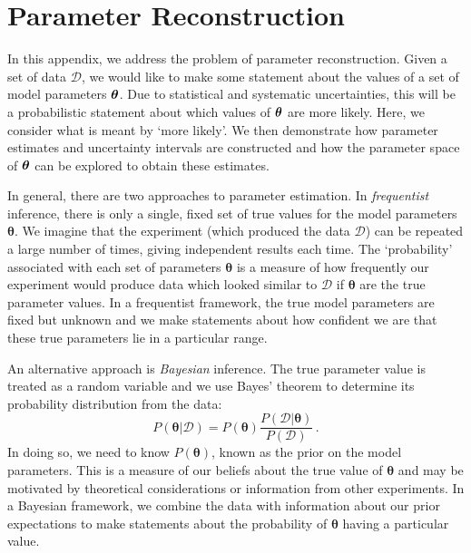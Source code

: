 \chapter{Parameter Reconstruction}
\label{ch:ParamRecon}



In this appendix, we address the problem of parameter reconstruction. Given a set of data $\mathcal{D}$, we would like to make some statement about the values of a set of model parameters $\boldsymbol\theta$. Due to statistical and systematic uncertainties, this will be a probabilistic statement about which values of $\boldsymbol\theta$ are more likely. Here, we consider what is meant by `more likely'. We then demonstrate how parameter estimates and uncertainty intervals are constructed and how the parameter space of $\boldsymbol\theta$ can be explored to obtain these estimates.

In general, there are two approaches to parameter estimation. In \textit{frequentist} inference, there is only a single, fixed set of true values for the model parameters $\boldsymbol\theta$. We imagine that the experiment (which produced the data $\mathcal{D}$) can be repeated a large number of times, giving independent results each time. The `probability' associated with each set of parameters $\boldsymbol\theta$ is a measure of how frequently our experiment would produce data which looked similar to $\mathcal{D}$ if $\boldsymbol\theta$ are the true parameter values. In a frequentist framework, the true model parameters are fixed but unknown and we make statements about how confident we are that these true parameters lie in a particular range.

An alternative approach is \textit{Bayesian} inference. The true parameter value is treated as a random variable and we use Bayes' theorem to determine its probability distribution from the data:
\begin{equation}
P(\boldsymbol\theta|\mathcal{D}) = P(\boldsymbol\theta) \frac{P(\mathcal{D}|\boldsymbol\theta)}{P(\mathcal{D})}\,.
\end{equation}
In doing so, we need to know $P(\boldsymbol\theta)$, known as the prior on the model parameters. This is a measure of our beliefs about the true value of $\boldsymbol\theta$ and may be motivated by theoretical considerations or information from other experiments. In a Bayesian framework, we combine the data with information about our prior expectations to make statements about the probability of $\boldsymbol\theta$ having a particular value.

